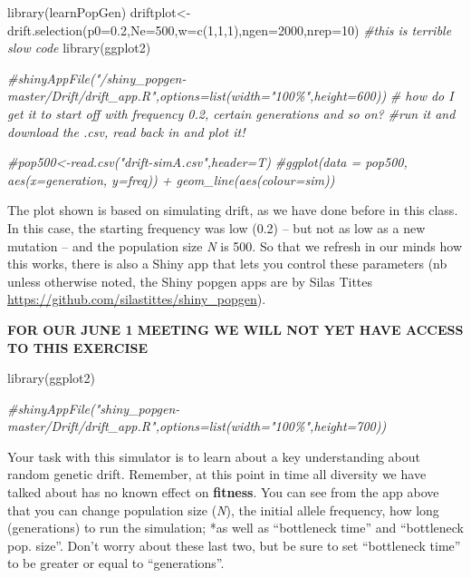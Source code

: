 \documentclass[
]{article}
\newenvironment{Shaded}{\begin{snugshade}}{\end{snugshade}}
\newcommand{\AttributeTok}[1]{\textcolor[rgb]{0.77,0.63,0.00}{#1}}
\newcommand{\CommentTok}[1]{\textcolor[rgb]{0.56,0.35,0.01}{\textit{#1}}}
\newcommand{\DecValTok}[1]{\textcolor[rgb]{0.00,0.00,0.81}{#1}}
\newcommand{\FloatTok}[1]{\textcolor[rgb]{0.00,0.00,0.81}{#1}}
\newcommand{\FunctionTok}[1]{\textcolor[rgb]{0.00,0.00,0.00}{#1}}
\newcommand{\NormalTok}[1]{#1}
\newcommand{\OtherTok}[1]{\textcolor[rgb]{0.56,0.35,0.01}{#1}}
\begin{document}
\begin{Shaded}
\begin{Highlighting}[]
\FunctionTok{library}\NormalTok{(learnPopGen)}
\NormalTok{driftplot}\OtherTok{\textless{}{-}}\FunctionTok{drift.selection}\NormalTok{(}\AttributeTok{p0=}\FloatTok{0.2}\NormalTok{,}\AttributeTok{Ne=}\DecValTok{500}\NormalTok{,}\AttributeTok{w=}\FunctionTok{c}\NormalTok{(}\DecValTok{1}\NormalTok{,}\DecValTok{1}\NormalTok{,}\DecValTok{1}\NormalTok{),}\AttributeTok{ngen=}\DecValTok{2000}\NormalTok{,}\AttributeTok{nrep=}\DecValTok{10}\NormalTok{)}
\CommentTok{\#this is terrible slow code}
\FunctionTok{library}\NormalTok{(ggplot2)}

\CommentTok{\#shinyAppFile("/shiny\_popgen{-}master/Drift/drift\_app.R",options=list(width="100\%",height=600))}
\CommentTok{\# how do I get it to start off with frequency 0.2, certain generations and so on?}
\CommentTok{\#run it and download the .csv, read back in and plot it!}

\CommentTok{\#pop500\textless{}{-}read.csv("drift{-}simA.csv",header=T)}
\CommentTok{\#ggplot(data = pop500, aes(x=generation, y=freq)) + geom\_line(aes(colour=sim))}
\end{Highlighting}
\end{Shaded}

The plot shown is based on simulating drift, as we have done before in
this class. In this case, the starting frequency was low (0.2) -- but
not as low as a new mutation -- and the population size \emph{N} is 500.
So that we refresh in our minds how this works, there is also a Shiny
app that lets you control these parameters (nb unless otherwise noted,
the Shiny popgen apps are by Silas Tittes
\url{https://github.com/silastittes/shiny_popgen}).

\textbf{FOR OUR JUNE 1 MEETING WE WILL NOT YET HAVE ACCESS TO THIS
EXERCISE}

\begin{Shaded}
\begin{Highlighting}[]
\FunctionTok{library}\NormalTok{(ggplot2)}

\CommentTok{\#shinyAppFile("shiny\_popgen{-}master/Drift/drift\_app.R",options=list(width="100\%",height=700))}
\end{Highlighting}
\end{Shaded}

Your task with this simulator is to learn about a key understanding
about random genetic drift. Remember, at this point in time all
diversity we have talked about has no known effect on \textbf{fitness}.
You can see from the app above that you can change population size
(\emph{N}), the initial allele frequency, how long (generations) to run
the simulation; *as well as ``bottleneck time'' and ``bottleneck pop.
size''. Don't worry about these last two, but be sure to set
``bottleneck time'' to be greater or equal to ``generations''.
\end{document}
